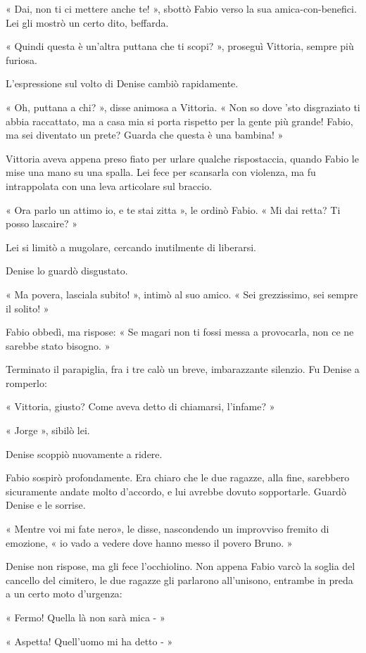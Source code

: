 « Dai, non ti ci mettere anche te! », sbottò Fabio verso la sua amica-con-benefici. Lei gli mostrò un certo dito, beffarda.

« Quindi questa è un'altra puttana che ti scopi? », proseguì Vittoria, sempre più furiosa.

L'espressione sul volto di Denise cambiò rapidamente.

« Oh, puttana a chi? », disse animosa a Vittoria. « Non so dove 'sto disgraziato ti abbia raccattato, ma a casa mia si porta rispetto per la gente più grande! Fabio, ma sei diventato un prete? Guarda che questa è una bambina! »

Vittoria aveva appena preso fiato per urlare qualche rispostaccia, quando Fabio le mise una mano su una spalla. Lei fece per scansarla con violenza, ma fu intrappolata con una leva articolare sul braccio.

« Ora parlo un attimo io, e te stai zitta », le ordinò Fabio. « Mi dai retta? Ti posso lascaire? » 

Lei si limitò a mugolare, cercando inutilmente di liberarsi. 

Denise lo guardò disgustato.

« Ma povera, lasciala subito! », intimò al suo amico. « Sei grezzissimo, sei sempre il solito! »

Fabio obbedì, ma rispose: « Se magari non ti fossi messa a provocarla, non ce ne sarebbe stato bisogno. »

Terminato il parapiglia, fra i tre calò un breve, imbarazzante silenzio. Fu Denise a romperlo:

« Vittoria, giusto? Come aveva detto di chiamarsi, l'infame? »

« Jorge », sibilò lei.

Denise scoppiò nuovamente a ridere.

Fabio sospirò profondamente. Era chiaro che le due ragazze, alla fine, sarebbero sicuramente andate molto d'accordo, e lui avrebbe dovuto sopportarle. Guardò Denise e le sorrise.

« Mentre voi mi fate nero», le disse, nascondendo un improvviso fremito di emozione, « io vado a vedere dove hanno messo il povero Bruno. »

Denise non rispose, ma gli fece l'occhiolino. Non appena Fabio varcò la soglia del cancello del cimitero, le due ragazze gli parlarono all'unisono, entrambe in preda a un certo moto d'urgenza:

« Fermo! Quella là non sarà mica - »

« Aspetta! Quell'uomo mi ha detto - »
